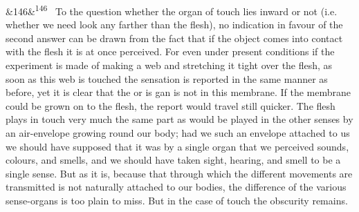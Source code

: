 \documentclass[12pt]{article}
\newcommand{\para}[1][]{\par\noindent\ifx&#1&\else\textsuperscript{\footnotesize #1}~\fi}
\begin{document}
\para[146] To the question whether the organ of touch lies inward or not (i.e. whether we need look any farther than the flesh), no indication in favour of the second answer can be drawn from the fact that if the object comes into contact with the flesh it is at once perceived. For even under present conditions if the experiment is made of making a web and stretching it tight over the flesh, as soon as this web is touched the sensation is reported in the same manner as before, yet it is clear that the or is gan is not in this membrane. If the membrane could be grown on to the flesh, the report would travel still quicker. The flesh plays in touch very much the same part as would be played in the other senses by an air-envelope growing round our body; had we such an envelope attached to us we should have supposed that it was by a single organ that we perceived sounds, colours, and smells, and we should have taken sight, hearing, and smell to be a single sense. But as it is, because that through which the different movements are transmitted is not naturally attached to our bodies, the difference of the various sense-organs is too plain to miss. But in the case of touch the obscurity remains.
\end{document}
